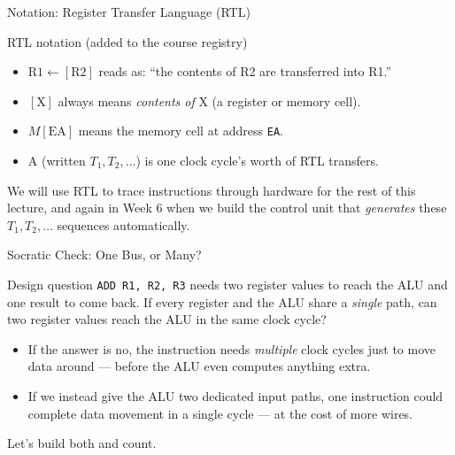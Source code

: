 \documentclass[aspectratio=169]{beamer}
\begin{document}
\begin{frame}{Notation: Register Transfer Language (RTL)}
  \begin{block}{RTL notation (added to the course registry)}
    \begin{itemize}
      \item $\text{R1} \gets [\text{R2}]$ \quad reads as: ``the contents of R2 are
        transferred into R1.''
      \item $[\text{X}]$ always means \emph{contents of} X (a register or memory cell).
      \item $M[\text{EA}]$ means the memory cell at address \texttt{EA}.
      \item A  (written $T_1, T_2, \dots$) is one clock cycle's
        worth of RTL transfers.
    \end{itemize}
  \end{block}
  We will use RTL to trace instructions through hardware for the rest of this
  lecture, and again in Week 6 when we build the control unit that
  \emph{generates} these $T_1, T_2, \dots$ sequences automatically.
\end{frame}

\begin{frame}{Socratic Check: One Bus, or Many?}
  \begin{alertblock}{Design question}
    \texttt{ADD R1, R2, R3} needs two register values to reach the ALU and one
    result to come back. If every register and the ALU share a \emph{single} path,
    can two register values reach the ALU in the same clock cycle?
  \end{alertblock}
  \begin{itemize}
    \item If the answer is no, the instruction needs \emph{multiple} clock cycles
      just to move data around --- before the ALU even computes anything extra.
    \item If we instead give the ALU two dedicated input paths, one instruction
      could complete data movement in a single cycle --- at the cost of more wires.
  \end{itemize}
  Let's build both and count.
\end{frame}


\end{document}
